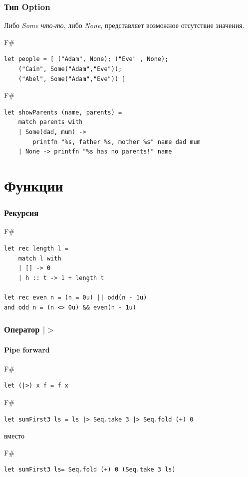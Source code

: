 \documentclass[xetex,mathserif,serif]{beamer}
\begin{document}
	\begin{frame}[fragile]
		\frametitle{Тип Option}
		Либо \textit{Some что-то}, либо \textit{None}, представляет возможное отсутствие значения.
		\begin{exampleblock}{F\#}
			\begin{verbatim}
let people = [ ("Adam", None); ("Eve" , None);
    ("Cain", Some("Adam","Eve"));
    ("Abel", Some("Adam","Eve")) ]
			\end{verbatim}
		\end{exampleblock}
		\begin{exampleblock}{F\#}
			\begin{verbatim}
let showParents (name, parents) =
    match parents with
    | Some(dad, mum) -> 
        printfn "%s, father %s, mother %s" name dad mum
    | None -> printfn "%s has no parents!" name
			\end{verbatim}
		\end{exampleblock}
\end{frame}

	\section{Функции}

	\begin{frame}[fragile]
		\frametitle{Рекурсия}
		\begin{exampleblock}{F\#}
			\begin{verbatim}
let rec length l =
    match l with
    | [] -> 0
    | h :: t -> 1 + length t

let rec even n = (n = 0u) || odd(n - 1u)
and odd n = (n <> 0u) && even(n - 1u)
			\end{verbatim}
		\end{exampleblock}
\end{frame}

	\begin{frame}[fragile]
		\frametitle{Оператор $|>$}
		\framesubtitle{Pipe forward}
		\begin{exampleblock}{F\#}
			\begin{verbatim}
let (|>) x f = f x
			\end{verbatim}
		\end{exampleblock}

		\begin{exampleblock}{F\#}
			\begin{verbatim}
let sumFirst3 ls = ls |> Seq.take 3 |> Seq.fold (+) 0
			\end{verbatim}
		\end{exampleblock}
		вместо
		\begin{exampleblock}{F\#}
			\begin{verbatim}
let sumFirst3 ls= Seq.fold (+) 0 (Seq.take 3 ls)
			\end{verbatim}
		\end{exampleblock}
\end{frame}
\end{document}
